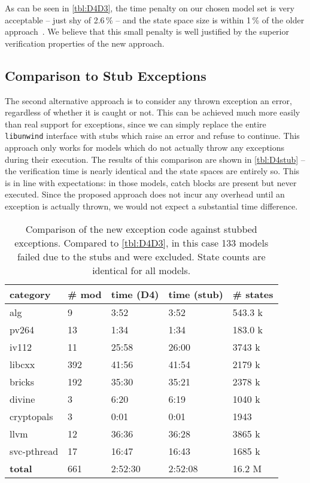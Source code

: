 As can be seen in \autoref{tbl:D4D3}, the time penalty on our chosen
model set is very acceptable -- just shy of 2.6\,\% -- and the state
space size is within 1\,\% of the older
approach~. We believe that this small
penalty is well justified by the superior verification properties of the
new approach.

\subsection{Comparison to Stub
Exceptions}\label{comparison-to-stub-exceptions}

The second alternative approach is to consider any thrown exception an
error, regardless of whether it is caught or not. This can be achieved
much more easily than real support for exceptions, since we can simply
replace the entire \texttt{libunwind} interface with stubs which raise
an error and refuse to continue. This approach only works for models
which do not actually throw any exceptions during their execution. The
results of this comparison are shown in \autoref{tbl:D4stub} -- the
verification time is nearly identical and the state spaces are entirely
so. This is in line with expectations: in those models, catch blocks are
present but never executed. Since the proposed approach does not incur
any overhead until an exception is actually thrown, we would not expect
a substantial time difference.

\begin{table}[tp]
\caption{\label{tbl:D4stub}Comparison of the new exception code against
stubbed exceptions. Compared to \autoref{tbl:D4D3}, in this case 133
models failed due to the stubs and were excluded. State counts are identical for all
models. }
\begin{tabularx}{\textwidth}{llLLL}
\toprule
category & \# mod & time (D4) & time (stub) & \# states\\
\midrule
alg & 9 & 3:52 & 3:52 & 543.3 k\\
pv264 & 13 & 1:34 & 1:34 & 183.0 k\\
iv112 & 11 & 25:58 & 26:00 & 3743 k\\
libcxx & 392 & 41:56 & 41:54 & 2179 k\\
bricks & 192 & 35:30 & 35:21 & 2378 k\\
divine & 3 & 6:20 & 6:19 & 1040 k\\
cryptopals & 3 & 0:01 & 0:01 & 1943\\
llvm & 12 & 36:36 & 36:28 & 3865 k\\
svc-pthread & 17 & 16:47 & 16:43 & 1685 k\\
\textbf{total} & 661 & 2:52:30 & 2:52:08 & 16.2 M\\
\bottomrule
\end{tabularx}
\end{table}

